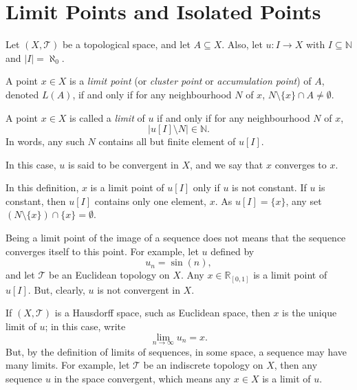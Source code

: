 \section{Limit Points and Isolated Points}


Let $(X, \mathcal T)$ be a topological space, and let $A \subseteq X$. Also, let $u: I \to X$ with $I \subseteq \mathbb N$ and $|I| = \aleph_0$.


\begin{definition}
	A point $x \in X$ is a \textit{limit point} (or \textit{cluster point} or \textit{accumulation point}) of $A$, denoted $L(A)$, if and only if for any neighbourhood $N$ of $x$, $N \setminus \{x\} \cap A \ne \emptyset$.
\end{definition}

\begin{definition}
	A point $x \in X$ is called a \textit{limit} of $u$ if and only if for any neighbourhood $N$ of $x$,
	$$
	|u[I] \setminus N| \in \mathbb N.
	$$
	In words, any such $N$ contains all but finite element of $u[I]$.
	
	In this case, $u$ is said to be convergent in $X$, and we say that $x$ converges to $x$.
\end{definition}


\begin{note}
	In this definition, $x$ is a limit point of $u[I]$ only if $u$ is not constant. If $u$ is constant, then $u[I]$ contains only one element, $x$. As $u[I] = \{x\}$, any set $(N \setminus \{x\}) \cap \{x\} = \emptyset$.
\end{note}


\begin{note}
	Being a limit point of the image of a sequence does not means that the sequence converges itself to this point. For example, let $u$ defined by
	$$
	u_n = \sin(n),
	$$
	and let $\mathcal T$ be an Euclidean topology on $X$. Any $x \in \mathbb R_{[0,1]}$ is a limit point of $u[I]$. But, clearly, $u$ is not convergent in $X$.
\end{note}


\begin{note}
	If $(X, \mathcal T)$ is a Hausdorff space, such as Euclidean space, then $x$ is the unique limit of $u$; in this case, write
	$$
	\lim_{n \to \infty} u_n = x.
	$$
	But, by the definition of limits of sequences, in some space, a sequence may have many limits. For example, let $\mathcal T$ be an indiscrete topology on $X$, then any sequence $u$ in the space convergent, which means any $x \in X$ is a limit of $u$.
\end{note}


